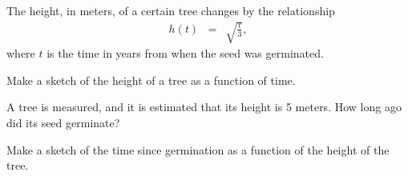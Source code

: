 
\begin{problem}
\item The height, in meters, of a certain tree changes by the
  relationship
  \begin{eqnarray*}
    h(t) & = & \sqrt{\frac{t}{3}},
  \end{eqnarray*}
  where $t$ is the time in years from when the seed was germinated. 
  \begin{subproblem}
  \item Make a sketch of the height of a tree as a function of time.
    \vfill
  \item A tree is measured, and it is estimated that its height is 5
    meters. How long ago did its seed germinate?
    \vfill
  \item Make a sketch of the time since germination as a function of
    the height of the tree.  
    \vfill
  \end{subproblem}

  \clearpage

\end{problem}


